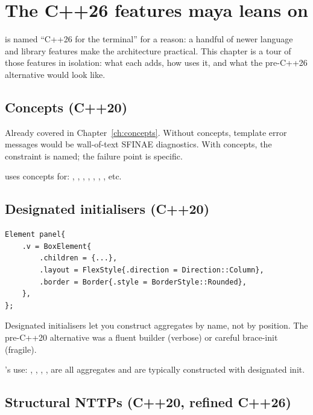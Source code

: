 \chapter{The C++26 features maya leans on}
\label{ch:cpp26-features}

\begin{aside}
\maya{} is named ``C++26 for the terminal'' for a reason: a
handful of newer language and library features make the
architecture practical. This chapter is a tour of those features
in isolation: what each adds, how \maya{} uses it, and what the
pre-C++26 alternative would look like.
\end{aside}

\section{Concepts (C++20)}

Already covered in Chapter~\ref{ch:concepts}. Without concepts,
template error messages would be wall-of-text SFINAE diagnostics.
With concepts, the constraint is named; the failure point is
specific.

\maya{} uses concepts for: , ,
, , ,
, , etc.

\section{Designated initialisers (C++20)}

\begin{lstlisting}
Element panel{
    .v = BoxElement{
        .children = {...},
        .layout = FlexStyle{.direction = Direction::Column},
        .border = Border{.style = BorderStyle::Rounded},
    },
};
\end{lstlisting}

Designated initialisers let you construct aggregates by name,
not by position. The pre-C++20 alternative was a fluent builder
(verbose) or careful brace-init (fragile).

\maya{}'s use: , , ,
,  are all aggregates and are
typically constructed with designated init.

\section{Structural NTTPs (C++20, refined C++26)}

